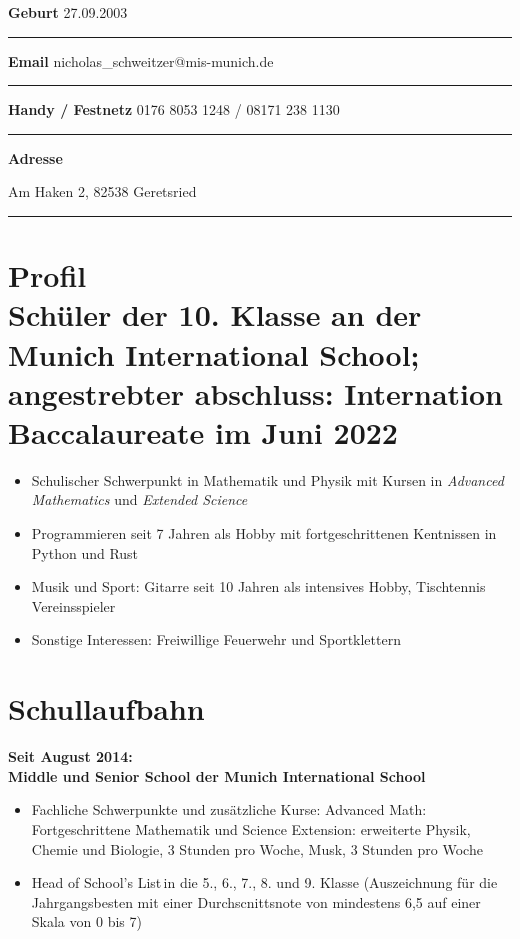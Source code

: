 \documentclass[12pt]{article}
\newcommand{\sect}[1]{\vspace{-12pt}\section*{#1}\vspace{-12pt}}
\newcommand{\sep}{{\color{gray}\vspace{-12pt}\hrule}}
\begin{document}
\textbf{Geburt} \hfill{27.09.2003} \, \\
\sep
\textbf{Email} \hfill{nicholas\_schweitzer@mis-munich.de} \, \\
\sep
\textbf{Handy / Festnetz} \hfill{0176 8053 1248 / 08171 238 1130} \, \\
\sep
\textbf{Adresse} \hfill{Am Haken 2, 82538 Geretsried \, \\
  \sep

  \sect{Profil \\
    Sch{\"u}ler der 10. Klasse an der Munich International School; angestrebter
    abschluss: Internation Baccalaureate im Juni 2022
  }
  \begin{itemize}
    \itemsep3pt

  \item Schulischer Schwerpunkt in Mathematik und Physik mit Kursen in \textit{\glqq
    Advanced Mathematics\grqq} und \textit{\glqq Extended Science\grqq}

  \item Programmieren seit 7 Jahren als Hobby mit fortgeschrittenen Kentnissen in
    Python und Rust

  \item Musik und Sport: Gitarre seit 10 Jahren als intensives Hobby,
    Tischtennis Vereinsspieler

  \item Sonstige Interessen: Freiwillige Feuerwehr und Sportklettern

  \end{itemize}
  \vspace{-12pt}

  \sect{Schullaufbahn}

  \textbf{Seit August 2014: \\
    Middle und Senior School der Munich International School
  }

  \vspace{-10pt}
  \begin{itemize}
    \itemsep3pt
  \item Fachliche Schwerpunkte und zus{\"a}tzliche Kurse: \glqq Advanced
    Math\grqq: Fortgeschrittene Mathematik und \glqq Science Extension\grqq:
    erweiterte Physik, Chemie und Biologie, 3 Stunden pro Woche, Musk, 3 Stunden
    pro Woche

  \item \glqq Head of School's List\grqq \,in die 5., 6., 7., 8. und 9. Klasse
    (Auszeichnung f{\"u}r die Jahrgangsbesten mit einer Durchscnittsnote von
    mindestens 6,5 auf einer Skala von 0 bis 7)


\end{itemize}}
\end{document}
